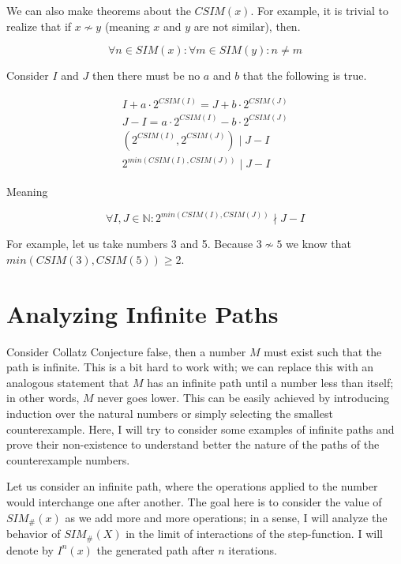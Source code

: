 \documentclass{article}
\begin{document}
We can also make theorems about the \(CSIM(x)\). For example, it is trivial to realize that if \(x \nsim y\) (meaning \(x\) and \(y\) are not similar), then.

\begin{equation}
	\forall n \in SIM(x): \forall m \in SIM(y): n \neq m
\end{equation}

Consider \(I\) and \(J\) then there must be no \(a\) and \(b\) that the following is true.

\begin{gather}
	I + a \cdot 2^{CSIM(I)} = J + b \cdot 2^{CSIM(J)} \nonumber \\
	J - I = a \cdot 2^{CSIM(I)} - b \cdot 2^{CSIM(J)} \nonumber \\
	(2^{CSIM(I)}, 2^{CSIM(J)}) \mid J - I \nonumber \\
	2^{min(CSIM(I), CSIM(J))} \mid J - I
\end{gather}

Meaning

\begin{equation}
	\forall I, J \in \mathbb{N}: 2^{min(CSIM(I), CSIM(J))} \nmid J - I
\end{equation}

For example, let us take numbers 3 and 5. Because \(3 \nsim 5\) we know that \(min(CSIM(3), CSIM(5)) \geq 2\).

\section{Analyzing Infinite Paths}

Consider Collatz Conjecture false, then a number \(M\) must exist such that the path is infinite. This is a bit hard to work with; we can replace this with an analogous statement that \(M\) has an infinite path until a number less than itself; in other words, \(M\) never goes lower. This can be easily achieved by introducing induction over the natural numbers or simply selecting the smallest counterexample. Here, I will try to consider some examples of infinite paths and prove their non-existence to understand better the nature of the paths of the counterexample numbers.

Let us consider an infinite path, where the operations applied to the number would interchange one after another. The goal here is to consider the value of \(SIM_\#(x)\) as we add more and more operations; in a sense, I will analyze the behavior of \(SIM_\#(X)\) in the limit of interactions of the step-function. I will denote by \(I^n(x)\) the generated path after \(n\) iterations.
\end{document}

